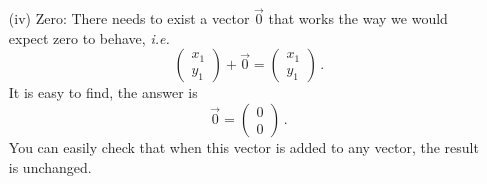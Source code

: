 {\begin{enumerate}
$$\begin{pmatrix}y_1\\y_2\end{pmatrix}\right)+
\begin{pmatrix}z_1\\z_2\end{pmatrix}
=
\begin{pmatrix}x_1+y_1\\x_2+y_2\end{pmatrix}+
\begin{pmatrix}z_1\\z_2\end{pmatrix}
=
\begin{pmatrix}(x_1+y_1)+z_1\\(x_2+y_2)+z_2\end{pmatrix}
$$ $$
=
\begin{pmatrix}x_1+(y_1+z_1)\\x_2+(y_2+z_2)\end{pmatrix}
=
\begin{pmatrix}x_1\\ y_1\end{pmatrix}+
\begin{pmatrix}y_1+z_1\\y_2+z_2\end{pmatrix}=
\begin{pmatrix}x_1\\x_2\end{pmatrix}+
\left(\begin{pmatrix}y_1\\y_2\end{pmatrix}+
\begin{pmatrix}z_1\\z_2\end{pmatrix}\right)\, .$$
\item[(iv)] Zero: There needs to exist a vector $\vec 0$ that works the way we would 
expect zero to behave, {\it i.e.}
$$
\begin{pmatrix}x_1\\y_1\end{pmatrix}+\vec 0=\begin{pmatrix}x_1\\y_1\end{pmatrix}\, .
$$
It is easy to find, the answer is
$$
\vec 0 = \begin{pmatrix}0\\0\end{pmatrix}\, .
$$
You can easily  check that when this vector is added to any vector, the result is unchanged.

\end{enumerate}}
